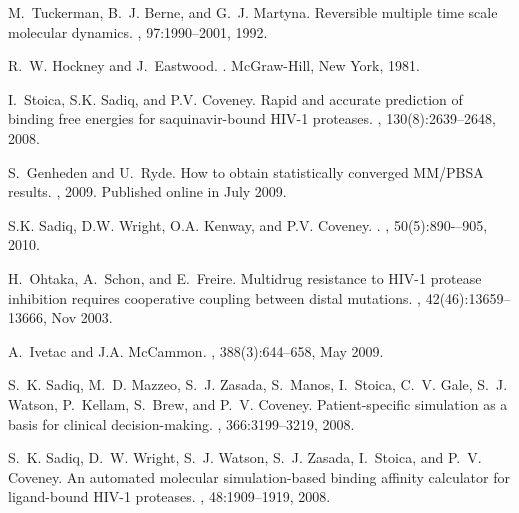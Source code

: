 \begin{thebibliography}{10}
M.~Tuckerman, B.~J. Berne, and G.~J. Martyna.
\newblock Reversible multiple time scale molecular dynamics.
, 97:1990--2001, 1992.

R.~W. Hockney and J.~Eastwood.
.
\newblock McGraw-Hill, New York, 1981.

I.~Stoica, S.K. Sadiq, and P.V. Coveney.
\newblock Rapid and accurate prediction of binding free energies for
  saquinavir-bound {HIV}-1 proteases.
, 130(8):2639--2648,
  2008.

S.~Genheden and U.~Ryde.
\newblock How to obtain statistically converged {MM/PBSA} results.
, 2009.
\newblock Published online in July 2009.

S.K. Sadiq, D.W. Wright, O.A. Kenway, and P.V. Coveney.
.
, 50(5):890-–905, 2010.

H.~Ohtaka, A.~Schon, and E.~Freire.
\newblock Multidrug resistance to {HIV-1} protease inhibition requires
  cooperative coupling between distal mutations.
, 42(46):13659--13666, Nov 2003.

A.~Ivetac and J.A. McCammon.
, 388(3):644--658, May 2009.

S.~K. Sadiq, M.~D. Mazzeo, S.~J. Zasada, S.~Manos, I.~Stoica, C.~V. Gale, S.~J.
  Watson, P.~Kellam, S.~Brew, and P.~V. Coveney.
\newblock Patient-specific simulation as a basis for clinical decision-making.
, 366:3199--3219, 2008.

S.~K. Sadiq, D.~W. Wright, S.~J. Watson, S.~J. Zasada, I.~Stoica, and P.~V.
  Coveney.
\newblock An automated molecular simulation-based binding affinity calculator
  for ligand-bound {HIV}-1 proteases.
, 48:1909--1919,
  2008.


\end{thebibliography}
